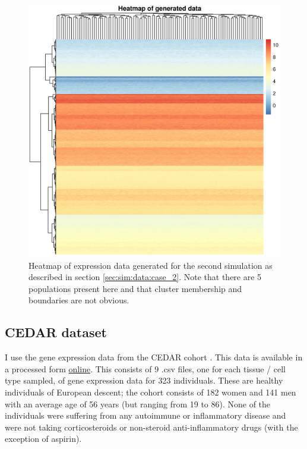 \documentclass[12pt]{article} %
\begin{document}
	\begin{figure}[!htb]
		\centering
		\includegraphics[scale=0.65]{Images/Gen_data/Case_2/data_pheatmap_0.png}
		\caption{Heatmap of expression data generated for the second simulation as described in section \ref{sec:sim:data:case_2}. Note that there are 5 populations present here and that cluster membership and boundaries are not obvious.}
		\label{fig:gen_data_sim_case_2}
	\end{figure}

	
	\subsection{CEDAR dataset}
	I use the gene expression data from the CEDAR cohort \cite{TheInternationalIBDGeneticsConsortiumIBDriskloci2018}. This data is available in a processed form \href{http://139.165.108.18/srv/genmol/permanent/1be6993fe41c12a051c9244d67c91da2be49e5dd26a6cd79f442bc006971e2ef/crohn-index.html}{online}. This consists of 9 .csv files, one for each tissue / cell type sampled, of gene expression data for 323 individuals. These are healthy individuals of European descent; the cohort consists of 182 women and 141 men with an average age of 56 years (but ranging from 19 to 86). None of the individuals were suffering from any autoimmune or inflammatory disease and were not taking corticosteroids or non-steroid anti-inflammatory drugs (with the exception of aspirin). 
	
\end{document}
